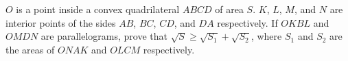 $O$ is a point inside a convex quadrilateral $ABCD$ of area $S$. $K$, $L$, $M$, and $N$ are interior points of the sides $AB$, $BC$, $CD$, and $DA$ respectively. If $OKBL$ and $OMDN$ are parallelograms, prove that $\sqrt{S} \geq \sqrt{S_1} + \sqrt{S_2}$, where $S_1$ and $S_2$ are the areas of $ONAK$ and $OLCM$ respectively.
